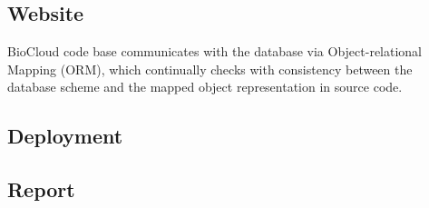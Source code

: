 \subsection{Website}




BioCloud code base communicates with the database via Object-relational Mapping
(ORM), which continually checks with consistency between the database scheme
and the mapped object representation in source code.



\subsection{Deployment}


\subsection{Report}


